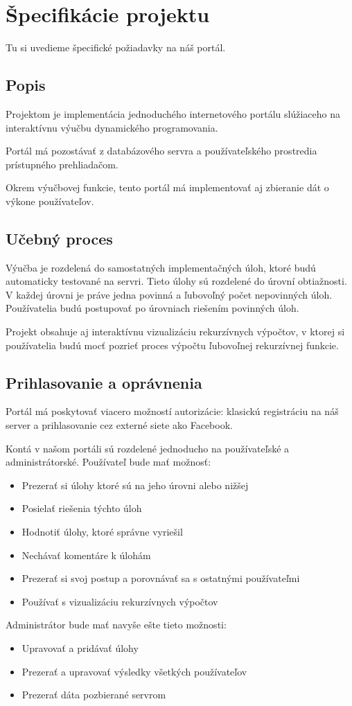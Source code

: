\chapter{Špecifikácie projektu}
Tu si uvedieme špecifické požiadavky na náš portál.

\section{Popis}
Projektom je implementácia jednoduchého internetového portálu slúžiaceho na interaktívnu výučbu
dynamického programovania.

Portál má pozostávať z databázového servra a používateľského prostredia
prístupného prehliadačom.

Okrem výučbovej funkcie, tento portál má implementovať aj zbieranie dát
o výkone používateľov.
\section{Učebný proces}
Výučba je rozdelená do samostatných implementačných úloh, ktoré budú automaticky
testované na servri. Tieto úlohy sú rozdelené do úrovní obtiažnosti.
V každej úrovni je práve jedna povinná a ľubovoľný počet nepovinných úloh.
Používatelia budú postupovať po úrovniach riešením povinných úloh.

Projekt obsahuje aj interaktívnu vizualizáciu rekurzívnych výpočtov,
v ktorej si používatelia budú mocť pozrieť proces výpočtu ľubovoľnej rekurzívnej funkcie.

\section{Prihlasovanie a oprávnenia}
Portál má poskytovať viacero možností autorizácie: klasickú registráciu
na náš server a prihlasovanie cez externé siete ako Facebook.

Kontá v našom portáli sú rozdelené jednoducho na používateľské a administrátorské.
\newpage
Používateľ bude mať možnosť:
\begin{itemize}
  \item Prezerať si úlohy ktoré sú na jeho úrovni alebo nižšej
  \item Posielať riešenia týchto úloh
  \item Hodnotiť úlohy, ktoré správne vyriešil
  \item Nechávať komentáre k úlohám
  \item Prezerať si svoj postup a porovnávať sa s ostatnými používateľmi
  \item Používať s vizualizáciu rekurzívnych výpočtov
\end{itemize}
Administrátor bude mať navyše ešte tieto možnosti:
\begin{itemize}
  \item Upravovať a pridávať úlohy
  \item Prezerať a upravovať výsledky všetkých používateľov
  \item Prezerať dáta pozbierané servrom
\end{itemize}

